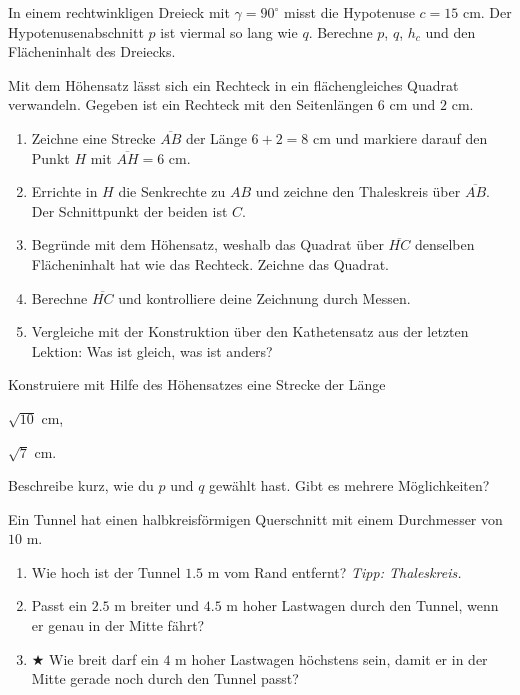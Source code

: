 \documentclass[11pt,oneside]{article}
\begin{document}
\begin{aufgabe}
	In einem rechtwinkligen Dreieck mit $\gamma=90^\circ$ misst die Hypotenuse $c=15$ cm. Der Hypotenusenabschnitt $p$ ist viermal so lang wie $q$. Berechne $p$, $q$, $h_c$ und den Flächeninhalt des Dreiecks.\par
\end{aufgabe}

\begin{aufgabe}[Ein Rechteck wird zum Quadrat] %
	Mit dem Höhensatz lässt sich ein Rechteck in ein flächengleiches Quadrat verwandeln. Gegeben ist ein Rechteck mit den Seitenlängen $6$ cm und $2$ cm.
	\begin{enumerate}[label=\alph*)]
		\item Zeichne eine Strecke $\overline{AB}$ der Länge $6+2=8$ cm und markiere darauf den Punkt $H$ mit $\overline{AH}=6$ cm.
		\item Errichte in $H$ die Senkrechte zu $AB$ und zeichne den Thaleskreis über $\overline{AB}$. Der Schnittpunkt der beiden ist $C$.
		\item Begründe mit dem Höhensatz, weshalb das Quadrat über $\overline{HC}$ denselben Flächeninhalt hat wie das Rechteck. Zeichne das Quadrat.
		\item Berechne $\overline{HC}$ und kontrolliere deine Zeichnung durch Messen.
		\item Vergleiche mit der Konstruktion über den Kathetensatz aus der letzten Lektion: Was ist gleich, was ist anders?
	\end{enumerate}
\end{aufgabe}

\begin{aufgabe} %
	Konstruiere mit Hilfe des Höhensatzes eine Strecke der Länge
	\begin{enumcols}[2]
		\item $\sqrt{10}$ cm,
		\item $\sqrt{7}$ cm.
	\end{enumcols}
	Beschreibe kurz, wie du $p$ und $q$ gewählt hast. Gibt es mehrere Möglichkeiten?\par
\end{aufgabe}

\begin{aufgabe}
	Ein Tunnel hat einen halbkreisförmigen Querschnitt mit einem Durchmesser von $10$ m.
	\begin{enumerate}[label=\alph*)]
		\item Wie hoch ist der Tunnel $1.5$ m vom Rand entfernt? \textit{Tipp: Thaleskreis.}
		\item Passt ein $2.5$ m breiter und $4.5$ m hoher Lastwagen durch den Tunnel, wenn er genau in der Mitte fährt?
		\item $\bigstar$ Wie breit darf ein $4$ m hoher Lastwagen höchstens sein, damit er in der Mitte gerade noch durch den Tunnel passt?
	\end{enumerate}
\end{aufgabe}
\end{document}
